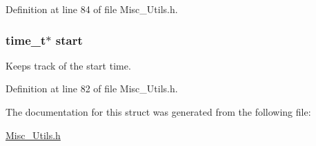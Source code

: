 Definition at line 84 of file Misc\+\_\+\+Utils.\+h.

\hypertarget{struct_timer__t_a9e8ad159996fcf54d4bdf8d6ec7199b7}{}
\subsubsection[{start}]{\setlength{\rightskip}{0pt plus 5cm}time\+\_\+t$\ast$ start}\label{struct_timer__t_a9e8ad159996fcf54d4bdf8d6ec7199b7}


Keeps track of the start time. 



Definition at line 82 of file Misc\+\_\+\+Utils.\+h.



The documentation for this struct was generated from the following file\+:\begin{DoxyCompactItemize}
\item 
\hyperlink{_misc___utils_8h}{Misc\+\_\+\+Utils.\+h}\end{DoxyCompactItemize}
